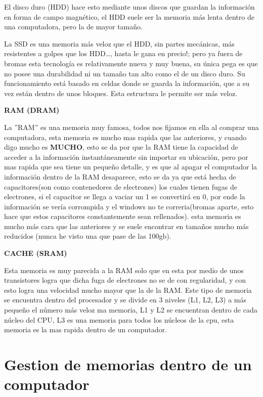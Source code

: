 \documentclass{article}
\begin{document}
El disco duro (HDD) hace esto mediante unos discos que guardan la información en forma de campo magnético, el HDD suele ser la memoria más lenta dentro de una computadora, pero la de mayor tamaño.
\vspace{0.4cm}


La SSD es una memoria más veloz que el HDD, sin partes mecánicas, más resistentes a golpes que los HDD…, hasta le gana en precio!; pero ya fuera de bromas esta tecnología es relativamente nueva y muy buena, su única pega es que no posee una durabilidad ni un tamaño tan alto como el de un disco duro. Su funcionamiento está basado en celdas donde se guarda la información, que a su vez están dentro de unos bloques. Esta estructura le permite ser más veloz.

\vspace{3cm}
\begin{center}
    \textbf{RAM (DRAM)}
\end{center}
La ''RAM'' es una memoria muy famosa, todos nos fijamos en ella al comprar una computadora, esta memoria es mucho mas rapida que las anteriores, y cuando digo mucho es \textbf{MUCHO}, esto se da por que la RAM tiene la capacidad de acceder a la información instantáneamente sin importar su ubicación, pero por mas rapida que sea tiene un pequeño detalle, y es que al apagar el computador la información dentro de la RAM desaparece, esto se da ya que está hecha de capacitores(son como contenedores de electrones) los cuales tienen fugas de electrones, si el capacitor se llega a vaciar un 1 se convertirá en 0,  por ende la información se vería corrompida y el windows no te correria(bromas aparte, esto hace que estos capacitores constantemente sean rellenados). esta memoria es mucho más cara que las anteriores y se suele encontrar en tamaños mucho más reducidos (nunca he visto una que pase de las 100gb).

\vspace{1cm}

\begin{center}
    \textbf{CACHE (SRAM)}
\end{center}

\vspace{1cm}
Esta memoria es muy parecida a la RAM solo que en esta por medio de unos transistores logra que dicha fuga de electrones no se de con regularidad, y con esto logra una velocidad mucho mayor que la de la RAM. Este tipo de memoria se encuentra dentro del procesador y se divide en 3 niveles (L1, L2, L3) a más pequeño el número más veloz ma memoria, L1 y L2 se encuentran dentro de cada núcleo del CPU, L3 es una memoria para todos los núcleos de la cpu, esta memoria es la mas rapida dentro de un computador.  
\vspace{3cm}
\section{Gestion de memorias dentro de un computador}
\end{document}
